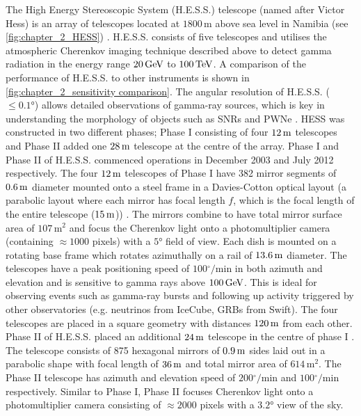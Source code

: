 The High Energy Stereoscopic System (H.E.S.S.) telescope (named after Victor Hess) is an array of telescopes located at $1800\,\si{\m}$ above sea level in Namibia (see \autoref{fig:chapter_2_HESS}) \citep{HESS}. H.E.S.S. consists of five telescopes and utilises the atmospheric Cherenkov imaging technique described above to detect gamma radiation in the energy range $20\,\si{\giga\electronvolt}$ to $100\,\TeV$. A comparison of the performance of H.E.S.S. to other instruments is shown in \autoref{fig:chapter_2_sensitivity comparison}. The angular resolution of H.E.S.S. ($\leq\ang{0.1}$) allows detailed observations of gamma-ray sources, which is key in understanding the morphology of objects such as SNRs and PWNe \citep{2018A&A...612A...1H}. HESS was constructed in two different phases; Phase I consisting of four $12\,\si{\meter}$ telescopes and Phase II added one $28\,\si{\meter}$ telescope at the centre of the array. Phase I and Phase II of H.E.S.S. commenced operations in December 2003 and July 2012 respectively. 
\newpar 
The four $12\,\si{\meter}$ telescopes of Phase I have 382 mirror segments of $0.6\,\si{\meter}$ diameter mounted onto a steel frame in a Davies-Cotton optical layout (a parabolic layout where each mirror has focal length $f$, which is the focal length of the entire telescope ($15\,\si{\meter}$)) \citep{2003APh....20..111B}. The mirrors combine to have total mirror surface area of $107\,\si{\meter\squared}$ and focus the Cherenkov light onto a photomultiplier camera (containing $\approx 1000$ pixels) with a $\ang{5}$ field of view. Each dish is mounted on a rotating base frame which rotates azimuthally on a rail of $13.6\,\si{\meter}$ diameter. The telescopes have a peak positioning speed of $100\si{^\circ\per\minute}$ in both azimuth and elevation and is sensitive to gamma rays above $100\,\si{\giga\electronvolt}$. This is ideal for observing events such as gamma-ray bursts and following up activity triggered by other observatories (e.g. neutrinos from IceCube, GRBs from Swift). The four telescopes are placed in a square geometry with distances $120\,\si{\meter}$ from each other.
\newpar
Phase II of H.E.S.S. placed an additional $24\,\si{\meter}$ telescope in the centre of phase I \citep{2005ICRC....5..163V}. The telescope consists of 875 hexagonal mirrors of $0.9\,\si{\meter}$ sides laid out in a parabolic shape with focal length of $36\,\si{\meter}$ and total mirror area of $614\,\si{\meter\squared}$. The Phase II telescope has azimuth and elevation speed of $200\si{^\circ\per\minute}$ and $100\si{^\circ\per\minute}$ respectively. Similar to Phase I, Phase II focuses Cherenkov light onto a photomultiplier camera consisting of $\approx 2000$ pixels with a $\ang{3.2}$ view of the sky.

